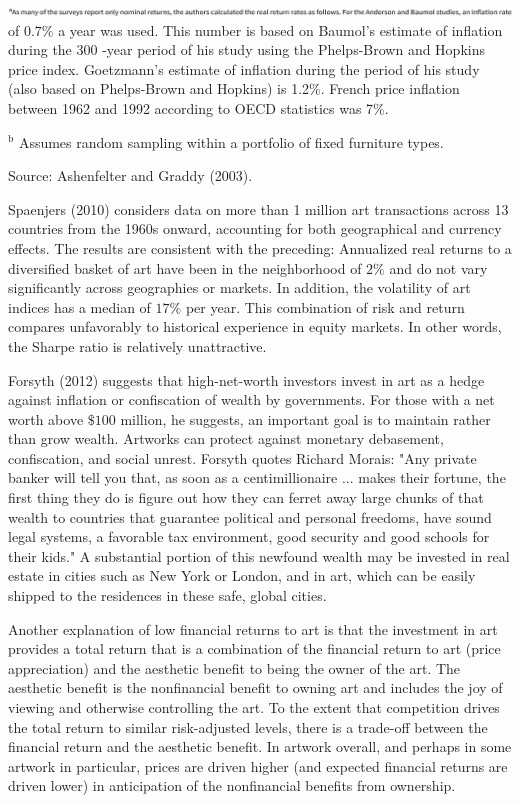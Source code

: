 \documentclass[11pt]{article}
\begin{document}
\includegraphics[max width=\textwidth, center]{2024_04_11_14fb13b1a1f6b829d6b6g-2}\\
of $0.7 \%$ a year was used. This number is based on Baumol's estimate of inflation during the 300 -year period of his study using the Phelps-Brown and Hopkins price index. Goetzmann's estimate of inflation during the period of his study (also based on Phelps-Brown and Hopkins) is 1.2\%. French price inflation between 1962 and 1992 according to OECD statistics was 7\%.

${ }^{\mathrm{b}}$ Assumes random sampling within a portfolio of fixed furniture types.

Source: Ashenfelter and Graddy (2003).

Spaenjers (2010) considers data on more than 1 million art transactions across 13 countries from the 1960s onward, accounting for both geographical and currency effects. The results are consistent with the preceding: Annualized real returns to a diversified basket of art have been in the neighborhood of $2 \%$ and do not vary significantly across geographies or markets. In addition, the volatility of art indices has a median of $17 \%$ per year. This combination of risk and return compares unfavorably to historical experience in equity markets. In other words, the Sharpe ratio is relatively unattractive.

Forsyth (2012) suggests that high-net-worth investors invest in art as a hedge against inflation or confiscation of wealth by governments. For those with a net worth above $\$ 100$ million, he suggests, an important goal is to maintain rather than grow wealth. Artworks can protect against monetary debasement, confiscation, and social unrest. Forsyth quotes Richard Morais: "Any private banker will tell you that, as soon as a centimillionaire ... makes their fortune, the first thing they do is figure out how they can ferret away large chunks of that wealth to countries that guarantee political and personal freedoms, have sound legal systems, a favorable tax environment, good security and good schools for their kids." A substantial portion of this newfound wealth may be invested in real estate in cities such as New York or London, and in art, which can be easily shipped to the residences in these safe, global cities.

Another explanation of low financial returns to art is that the investment in art provides a total return that is a combination of the financial return to art (price appreciation) and the aesthetic benefit to being the owner of the art. The aesthetic benefit is the nonfinancial benefit to owning art and includes the joy of viewing and otherwise controlling the art. To the extent that competition drives the total return to similar risk-adjusted levels, there is a trade-off between the financial return and the aesthetic benefit. In artwork overall, and perhaps in some artwork in particular, prices are driven higher (and expected financial returns are driven lower) in anticipation of the nonfinancial benefits from ownership.
\end{document}
